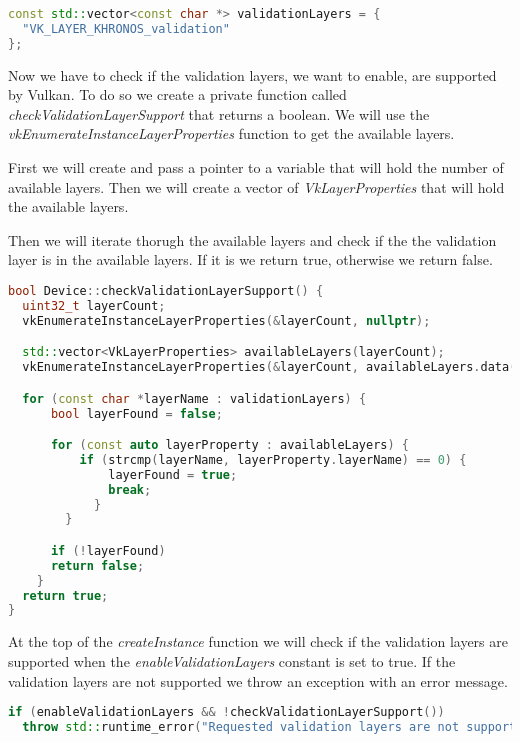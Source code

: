 \documentclass[12pt]{report} \usepackage{preamble}
\begin{document}
\begin{lstlisting}[language=C++]
const std::vector<const char *> validationLayers = {
  "VK_LAYER_KHRONOS_validation"
};
\end{lstlisting}

Now we have to check if the validation layers, we want to enable, are supported by Vulkan.
To do so we create a private function called \textit{checkValidationLayerSupport} that returns a boolean.
We will use the \textit{vkEnumerateInstanceLayerProperties} function to get the available layers.

First we will create and pass a pointer to a variable that will hold the number of available layers.
Then we will create a vector of \textit{VkLayerProperties} that will hold the available layers.

Then we will iterate thorugh the available layers and check if the the validation layer is in the available layers.
If it is we return true, otherwise we return false.

\begin{lstlisting}[language=C++]
bool Device::checkValidationLayerSupport() {
  uint32_t layerCount;
  vkEnumerateInstanceLayerProperties(&layerCount, nullptr);

  std::vector<VkLayerProperties> availableLayers(layerCount);
  vkEnumerateInstanceLayerProperties(&layerCount, availableLayers.data());

  for (const char *layerName : validationLayers) {
      bool layerFound = false;

      for (const auto layerProperty : availableLayers) {
          if (strcmp(layerName, layerProperty.layerName) == 0) {
              layerFound = true;
              break;
            }
        }

      if (!layerFound)
      return false;
    }
  return true;
}
\end{lstlisting}

At the top of the \textit{createInstance} function we will check if the validation layers are supported
when the \textit{enableValidationLayers} constant is set to true. If the validation layers are not
supported we throw an exception with an error message.

\begin{lstlisting}[language=C++]
if (enableValidationLayers && !checkValidationLayerSupport())
  throw std::runtime_error("Requested validation layers are not supported!");
\end{lstlisting}
\end{document}
